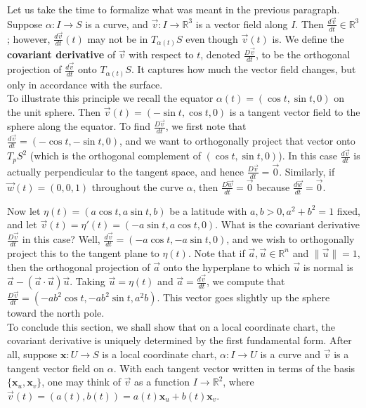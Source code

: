 \documentclass[leqno]{book}
\begin{document}
Let us take the time to formalize what was meant in the previous paragraph.  Suppose $\alpha:I\to S$ is a curve, and $\vec v:I\to\mathbb R^3$ is a vector field along $I$.  Then $\frac{d\vec v}{dt}\in\mathbb R^3$; however, $\frac{d\vec v}{dt}(t)$ may not be in $T_{\alpha(t)}S$ even though $\vec v(t)$ is.  We define the \textbf{covariant derivative} of $\vec v$ with respect to $t$, denoted $\frac{D\vec v}{dt}$, to be the orthogonal projection of $\frac{d\vec v}{dt}$ onto $T_{\alpha(t)}S$.  It captures how much the vector field changes, but only in accordance with the surface.\\

\noindent To illustrate this principle we recall the equator $\alpha(t)=(\cos t,\sin t,0)$ on the unit sphere.  Then $\vec v(t)=(-\sin t,\cos t,0)$ is a tangent vector field to the sphere along the equator.  To find $\frac{D\vec v}{dt}$, we first note that $\frac{d\vec v}{dt}=(-\cos t,-\sin t,0)$, and we want to orthogonally project that vector onto $T_pS^2$ (which is the orthogonal complement of $(\cos t,\sin t,0)$).  In this case $\frac{d\vec v}{dt}$ is actually perpendicular to the tangent space, and hence $\frac{D\vec v}{dt}=\vec 0$.  Similarly, if $\vec w(t)=(0,0,1)$ throughout the curve $\alpha$, then $\frac{D\vec w}{dt}=\vec 0$ because $\frac{d\vec w}{dt}=\vec 0$.

Now let $\eta(t)=(a\cos t,a\sin t,b)$ be a latitude with $a,b>0,a^2+b^2=1$ fixed, and let $\vec v(t)=\eta'(t)=(-a\sin t,a\cos t,0)$.  What is the covariant derivative $\frac{D\vec v}{dt}$ in this case?  Well, $\frac{d\vec v}{dt}=(-a\cos t,-a\sin t,0)$, and we wish to orthogonally project this to the tangent plane to $\eta(t)$.  Note that if $\vec a,\vec u\in\mathbb R^n$ and $\|\vec u\|=1$, then the orthogonal projection of $\vec a$ onto the hyperplane to which $\vec u$ is normal is $\vec a-(\vec a\cdot\vec u)\vec u$.  Taking $\vec u=\eta(t)$ and $\vec a=\frac{d\vec v}{dt}$, we compute that $\frac{D\vec v}{dt}=(-ab^2\cos t,-ab^2\sin t,a^2b)$.  This vector goes slightly up the sphere toward the north pole.\\

\noindent To conclude this section, we shall show that on a local coordinate chart, the covariant derivative is uniquely determined by the first fundamental form.  After all, suppose $\mathbf x:U\to S$ is a local coordinate chart, $\alpha:I\to U$ is a curve and $\vec v$ is a tangent vector field on $\alpha$.  With each tangent vector written in terms of the basis $\{\mathbf x_u,\mathbf x_v\}$, one may think of $\vec v$ as a function $I\to\mathbb R^2$, where $\vec v(t)=(a(t),b(t))=a(t)\mathbf x_u+b(t)\mathbf x_v$.
\end{document}
